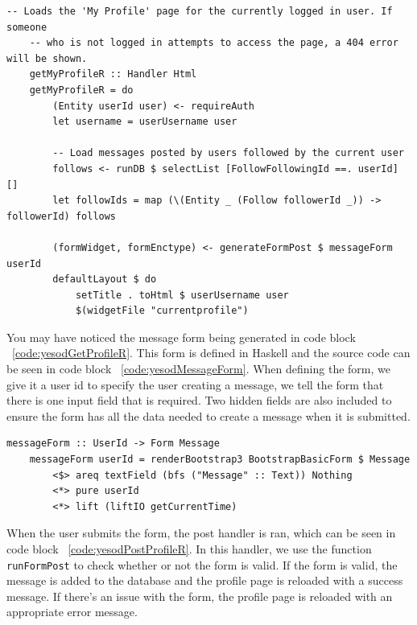 
\begin{lstlisting}[caption={GET request handler for current profile page},label={code:yesodGetProfileR}]
    -- Loads the 'My Profile' page for the currently logged in user. If someone
    -- who is not logged in attempts to access the page, a 404 error will be shown.
    getMyProfileR :: Handler Html
    getMyProfileR = do
        (Entity userId user) <- requireAuth
        let username = userUsername user
    
        -- Load messages posted by users followed by the current user
        follows <- runDB $ selectList [FollowFollowingId ==. userId] []
        let followIds = map (\(Entity _ (Follow followerId _)) -> followerId) follows
    
        (formWidget, formEnctype) <- generateFormPost $ messageForm userId
        defaultLayout $ do
            setTitle . toHtml $ userUsername user
            $(widgetFile "currentprofile")
\end{lstlisting}

You may have noticed the message form being generated in code block ~\ref{code:yesodGetProfileR}.
This form is defined in Haskell and the source code can be seen in code block ~\ref{code:yesodMessageForm}.
When defining the form, we give it a user id to specify the user creating a message, 
we tell the form that there is one input field that is required. Two hidden fields
are also included to ensure the form has all the data needed to create a message
when it is submitted.

\begin{lstlisting}[caption={The message form},label={code:yesodMessageForm}]
    messageForm :: UserId -> Form Message
    messageForm userId = renderBootstrap3 BootstrapBasicForm $ Message
        <$> areq textField (bfs ("Message" :: Text)) Nothing
        <*> pure userId
        <*> lift (liftIO getCurrentTime)
\end{lstlisting}

When the user submits the form, the post handler is ran, which can be seen in code block
~\ref{code:yesodPostProfileR}. In this handler, we use the function \texttt{runFormPost}
to check whether or not the form is valid. If the form is valid, the message is added
to the database and the profile page is reloaded with a success message. If there's an
issue with the form, the profile page is reloaded with an appropriate error message.

